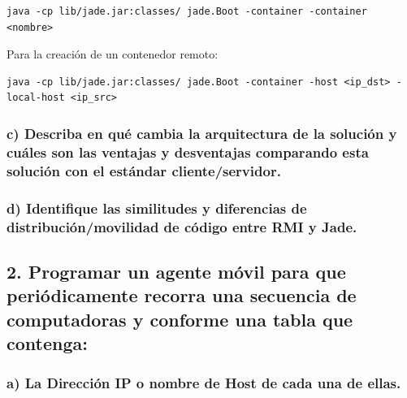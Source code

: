 \documentclass[11pt]{article}
\begin{document}
\begin{verbatim}
java -cp lib/jade.jar:classes/ jade.Boot -container -container <nombre>
\end{verbatim}

Para la creación de un contenedor remoto:

\begin{verbatim}
java -cp lib/jade.jar:classes/ jade.Boot -container -host <ip_dst> -local-host <ip_src>
\end{verbatim}

    \hypertarget{c-describa-en-quuxe9-cambia-la-arquitectura-de-la-soluciuxf3n-y-cuuxe1les-son-las-ventajas-y-desventajas-comparando-esta-soluciuxf3n-con-el-estuxe1ndar-clienteservidor.}{%
\subsubsection{c) Describa en qué cambia la arquitectura de la solución
y cuáles son las ventajas y desventajas comparando esta solución con el
estándar
cliente/servidor.}\label{c-describa-en-quuxe9-cambia-la-arquitectura-de-la-soluciuxf3n-y-cuuxe1les-son-las-ventajas-y-desventajas-comparando-esta-soluciuxf3n-con-el-estuxe1ndar-clienteservidor.}}

    \hypertarget{d-identifique-las-similitudes-y-diferencias-de-distribuciuxf3nmovilidad-de-cuxf3digo-entre-rmi-y-jade.}{%
\subsubsection{d) Identifique las similitudes y diferencias de
distribución/movilidad de código entre RMI y
Jade.}\label{d-identifique-las-similitudes-y-diferencias-de-distribuciuxf3nmovilidad-de-cuxf3digo-entre-rmi-y-jade.}}

    \hypertarget{programar-un-agente-muxf3vil-para-que-periuxf3dicamente-recorra-una-secuencia-de-computadoras-y-conforme-una-tabla-que-contenga}{%
\subsection{2. Programar un agente móvil para que periódicamente recorra
una secuencia de computadoras y conforme una tabla que
contenga:}\label{programar-un-agente-muxf3vil-para-que-periuxf3dicamente-recorra-una-secuencia-de-computadoras-y-conforme-una-tabla-que-contenga}}

    \hypertarget{a-la-direcciuxf3n-ip-o-nombre-de-host-de-cada-una-de-ellas.}{%
\subsubsection{a) La Dirección IP o nombre de Host de cada una de
ellas.}\label{a-la-direcciuxf3n-ip-o-nombre-de-host-de-cada-una-de-ellas.}}
\end{document}

